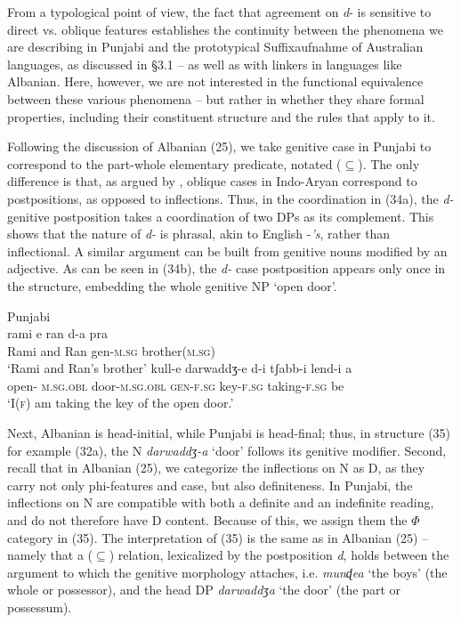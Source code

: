 \documentclass[output=paper]{langsci/langscibook}
\begin{document}
From a typological point of view, the fact that agreement on \textit{d}{}- is sensitive to direct vs. oblique features establishes the continuity between the phenomena we are describing in Punjabi and the prototypical Suffixaufnahme of Australian languages, as discussed in §3.1 – as well as with linkers in languages like Albanian. Here, however, we are not interested in the functional equivalence between these various phenomena – but rather in whether they share formal properties, including their constituent structure and the rules that apply to it.    

Following the discussion of Albanian (25), we take genitive case in Punjabi to correspond to the part-whole elementary predicate, notated ($\subseteq$). The only difference is that, as argued by \citet{Payne1995}, oblique cases in Indo-Aryan correspond to postpositions, as opposed to inflections. Thus, in the coordination in (34a), the \textit{d-} genitive postposition takes a coordination of two DPs as its complement. This shows that the nature of \textit{d-} is phrasal, akin to English -\textit{’s}, rather than inflectional. A similar argument can be built from genitive nouns modified by an adjective. As can be seen in (34b), the \textit{d-} case postposition appears only once in the structure, embedding the whole genitive NP ‘open door’.

\ea%
    Punjabi\label{ex:manzini:34}\\
    \ea
    \gll    rami   e   ran   d-a   pra\\
              Rami   and  Ran  gen-\textsc{m.sg}  brother\textsc{(m.sg)}  \\
    \glt     ‘Rami and Ran’s brother’
    \ex  
    \gll    kull-e   darwaddʒ-e  d-i   tʃabb-i   lend-i   a  \\
             open- \textsc{m.sg.obl}   door-\textsc{m.sg.obl}  \textsc{gen-f.sg}   key-\textsc{f.sg}  taking-\textsc{f.sg}  be \\
    \glt     ‘I(\textsc{f}) am taking the key of the open door.’ 
    \z
\z

Next, Albanian is head-initial, while Punjabi is head-final; thus, in structure (35) for example (32a), the N \textit{darwaddʒ-a} ‘door’ follows its genitive modifier. Second, recall that in Albanian (25), we categorize the inflections on N as D, as they carry not only phi-features and case, but also definiteness. In Punjabi, the inflections on N are compatible with both a definite and an indefinite reading, and do not therefore have D content. Because of this, we assign them the $\Phi $ category in (35). The interpretation of (35) is the same as in Albanian (25) – namely that a ($\subseteq$) relation, lexicalized by the postposition \textit{d}, holds between the argument to which the genitive morphology attaches, i.e. \textit{munɖea} ‘the boys’ (the whole or possessor), and the head DP \textit{darwaddʒ}\textit{a} ‘the door’ (the part or possessum).
\end{document}
